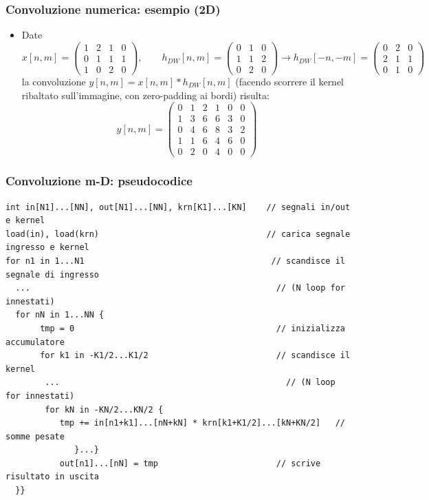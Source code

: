 \documentclass[12pt, a4paper]{article}
\begin{document}
\subsubsection{Convoluzione numerica: esempio (2D)}
\begin{itemize}
    \item Date
    $$x[n,m]=\begin{pmatrix}1&2&1&0\\0&1&1&1\\1&0&2&0\end{pmatrix}, \qquad h_{DW}[n,m]=\begin{pmatrix}0&1&0\\1&1&2\\0&2&0\end{pmatrix} \to h_{DW}[-n,-m]=\begin{pmatrix}0&2&0\\2&1&1\\0&1&0\end{pmatrix}$$
    la convoluzione $y[n,m]=x[n,m]*h_{DW}[n,m]$ (facendo scorrere il kernel ribaltato sull'immagine, con zero-padding ai bordi) risulta:
    $$y[n,m] = \begin{pmatrix}0&1&2&1&0&0\\1&3&6&6&3&0\\0&4&6&8&3&2\\1&1&6&4&6&0\\0&2&0&4&0&0\end{pmatrix}$$
\end{itemize}

\subsubsection{Convoluzione m-D: pseudocodice}
\begin{verbatim}
int in[N1]...[NN], out[N1]...[NN], krn[K1]...[KN]    // segnali in/out e kernel
load(in), load(krn)                                  // carica segnale ingresso e kernel
for n1 in 1...N1                                      // scandisce il segnale di ingresso
  ...                                                  // (N loop for innestati)
  for nN in 1...NN {
       tmp = 0                                         // inizializza accumulatore
       for k1 in -K1/2...K1/2                          // scandisce il kernel
        ...                                              // (N loop for innestati)
        for kN in -KN/2...KN/2 {
           tmp += in[n1+k1]...[nN+kN] * krn[k1+K1/2]...[kN+KN/2]   // somme pesate
              }...}
           out[n1]...[nN] = tmp                        // scrive risultato in uscita
  }}
\end{verbatim}
\end{document}

